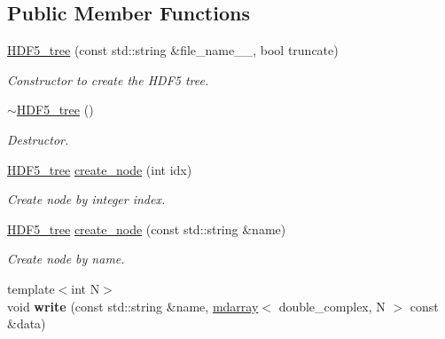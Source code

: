 \subsection*{Public Member Functions}
\begin{DoxyCompactItemize}
\item 
\hyperlink{classsirius_1_1_h_d_f5__tree_a2d10bd81b9b5e4f4a0f4e8301b82345b}{H\+D\+F5\+\_\+tree} (const std\+::string \&file\+\_\+name\+\_\+\+\_\+, bool truncate)
\begin{DoxyCompactList}\small\item\em Constructor to create the H\+D\+F5 tree. \end{DoxyCompactList}\item 
\hyperlink{classsirius_1_1_h_d_f5__tree_ab4fc0fde041c16da1ba01d70a75ded36}{$\sim$\+H\+D\+F5\+\_\+tree} ()
\begin{DoxyCompactList}\small\item\em Destructor. \end{DoxyCompactList}\item 
\hyperlink{classsirius_1_1_h_d_f5__tree}{H\+D\+F5\+\_\+tree} \hyperlink{classsirius_1_1_h_d_f5__tree_a5791cd665a746fe6e43d86dd3cfcec94}{create\+\_\+node} (int idx)
\begin{DoxyCompactList}\small\item\em Create node by integer index. \end{DoxyCompactList}\item 
\hyperlink{classsirius_1_1_h_d_f5__tree}{H\+D\+F5\+\_\+tree} \hyperlink{classsirius_1_1_h_d_f5__tree_a8bc9601880e0c4cfa67684341d9383b3}{create\+\_\+node} (const std\+::string \&name)
\begin{DoxyCompactList}\small\item\em Create node by name. \end{DoxyCompactList}\item 
\hypertarget{classsirius_1_1_h_d_f5__tree_a9ea919f73acf722c62c236090653a1f8}{}{\footnotesize template$<$int N$>$ }\\void {\bfseries write} (const std\+::string \&name, \hyperlink{classsddk_1_1mdarray}{mdarray}$<$ double\+\_\+complex, N $>$ const \&data)\label{classsirius_1_1_h_d_f5__tree_a9ea919f73acf722c62c236090653a1f8}


\end{DoxyCompactItemize}
